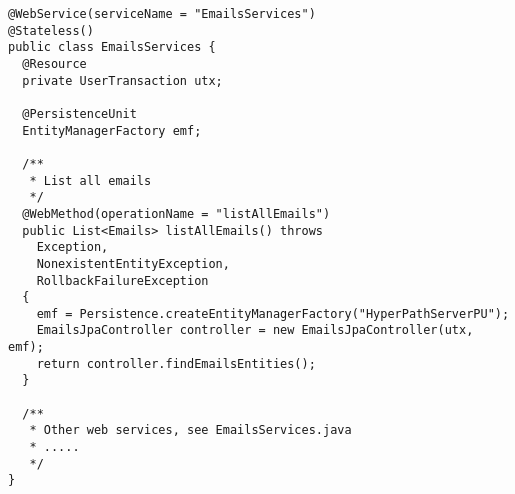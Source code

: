 \begin{lstlisting}[label=WebService Bean,caption=WebService Bean]
@WebService(serviceName = "EmailsServices")
@Stateless()
public class EmailsServices {
  @Resource
  private UserTransaction utx;

  @PersistenceUnit
  EntityManagerFactory emf;
	
  /**
   * List all emails
   */
  @WebMethod(operationName = "listAllEmails")
  public List<Emails> listAllEmails() throws 
    Exception, 
    NonexistentEntityException, 
    RollbackFailureException 
  {
    emf = Persistence.createEntityManagerFactory("HyperPathServerPU");
    EmailsJpaController controller = new EmailsJpaController(utx, emf);
    return controller.findEmailsEntities();
  }
  
  /**
   * Other web services, see EmailsServices.java
   * .....
   */
}
\end{lstlisting}